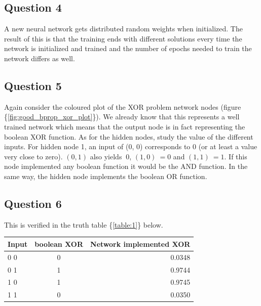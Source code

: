 \documentclass[a4paper]{article}
\begin{document}
\subsection*{Question 4}
A new neural network gets distributed random weights 
when initialized. The result of this is that the training ends with different 
solutions every time the network is initialized and trained and the 
number of epochs needed to train the network differs as well. 
\subsection*{Question 5}
Again consider the coloured plot of the XOR problem 
network nodes (figure \{\ref{fig:good_bprop_xor_plot}\}). We already 
know that this represents a well trained network which means that the output node is 
in fact representing the boolean XOR function. As for the hidden nodes, study the value 
of the different inputs. For hidden node 1, an input of (0, 0) corresponds to 0 (or 
at least a value very close to zero). $(0, 1)$ also yields $~ 0$, $(1, 0) ~= 0$ and 
$(1, 1) ~= 1$. If this node implemented any boolean function it would be the AND function.
In the same way, the hidden node implements the boolean OR function. 
\subsection*{Question 6}
This is verified in the truth table \{\ref{table:1}\} below. 

\begin{center}
	\label{table:1}
    \begin{tabular} {l | c | r }
        Input & boolean XOR & Network implemented XOR \\
		\hline
        0 0 & 0 & 0.0348 \\
        0 1 & 1 & 0.9744 \\
        1 0 & 1 & 0.9745 \\
        1 1 & 0 & 0.0350 \\
    \end{tabular}
\end{center}
\end{document}
